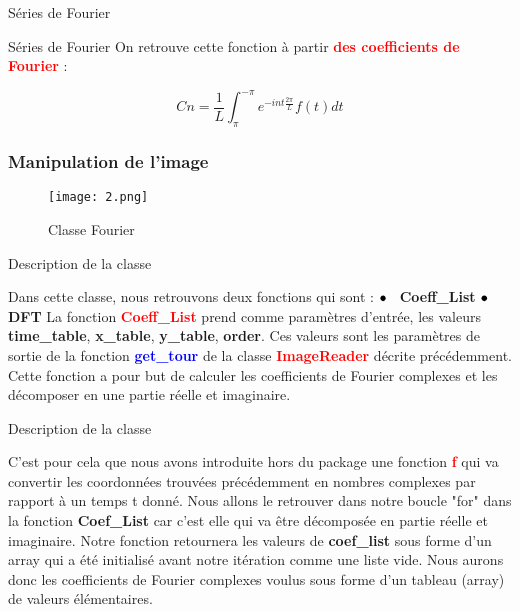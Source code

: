 \documentclass[aspectratio=169]{beamer}
\begin{document}
\begin{frame}{Séries de Fourier}
    
\begin{block}{Séries de Fourier} 
On retrouve cette fonction à partir \textcolor{red}{\textbf{ des coefficients de Fourier}} :

$$\boxed{Cn = \frac{1}{L}\int^{-\pi}_{\pi}e^{- i n t\frac{2\pi}{L}}f(t)dt}$$

\end{block}
\end{frame}

 \begin{frame}
  \frametitle{Manipulation de l'image }
  \begin{figure}[htpb]
        \begin{center}
            \texttt{[image: 2.png]}
            \caption{Classe Fourier}
        \end{center}
    \end{figure}
  
\end{frame}



\begin{frame}{Description de la classe}

Dans cette classe, nous retrouvons deux fonctions qui sont :
\vskip 0.3cm
\hspace{5cm} $\bullet \hspace{0.2cm}$ \textbf{Coeff\_List}
\vskip 0.3cm
\hspace{5cm} $\bullet \hspace{0.2cm}$ \textbf{DFT}
\vskip 0.3cm
La fonction \textcolor{red}{\textbf{Coeff\_List}} prend comme paramètres d'entrée, les valeurs \textbf{time\_table},  \textbf{x\_table}, \textbf{y\_table}, \textbf{order}.
\vskip 0.3cm
Ces valeurs sont les paramètres de sortie de la fonction \textcolor{blue}{\textbf{get\_tour}} de la classe  \textcolor{red}{\textbf{ImageReader}} décrite précédemment.
\vskip 0.3cm
Cette fonction a pour but de calculer les coefficients de Fourier complexes et les décomposer en une partie réelle et imaginaire. 

\end{frame}


\begin{frame}{Description de la classe}

C'est pour cela que nous avons introduite hors du package une fonction \textcolor{red}{\textbf{f}} qui va convertir les coordonnées trouvées précédemment en nombres complexes par rapport à un temps t donné.
\vskip 0.3cm
Nous allons le retrouver dans notre boucle "for" dans la fonction \textbf{Coef\_List} car c'est elle qui va être décomposée en partie réelle et imaginaire. 
\vskip 0.3cm
Notre fonction retournera les valeurs de \textbf{coef\_list} sous forme d'un array qui a été initialisé avant notre itération comme une liste vide.
\vskip 0.3cm
Nous aurons donc les coefficients de Fourier complexes voulus sous forme d'un tableau (array) de valeurs élémentaires. 
\end{frame}
\end{document}
